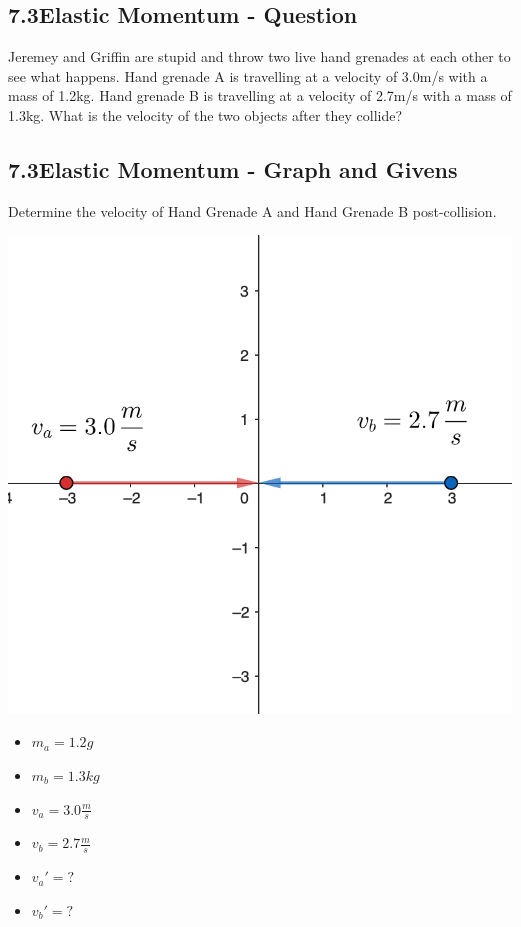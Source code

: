 \subsection*{7.3\hspace*{0.5cm}Elastic Momentum - Question}
Jeremey and Griffin are stupid and throw two live hand grenades at each other to see what happens. Hand grenade A is travelling at a velocity of 3.0m/s with a mass of 1.2kg. Hand grenade B is travelling at a velocity of 2.7m/s with a mass of 1.3kg. What is the velocity of the two objects after they collide?
\subsection*{7.3\hspace*{0.5cm}Elastic Momentum - Graph and Givens}
Determine the velocity of Hand Grenade A and Hand Grenade B post-collision.\newline\newline
\begin{minipage}{0.5\textwidth}
    \includegraphics[scale=0.33]{./images/elastic_collision}
\end{minipage}
\begin{minipage}{0.5\textwidth}
    \begin{itemize}
        \item $m_{a} = 1.2g$
        \item $m_{b} = 1.3kg$
        \item $v_{a} = 3.0\frac{m}{s}$
        \item $v_{b} = 2.7\frac{m}{s}$
        \item $v_{a}\prime = ?$
        \item $v_{b}\prime = ?$
    \end{itemize}
\end{minipage}
